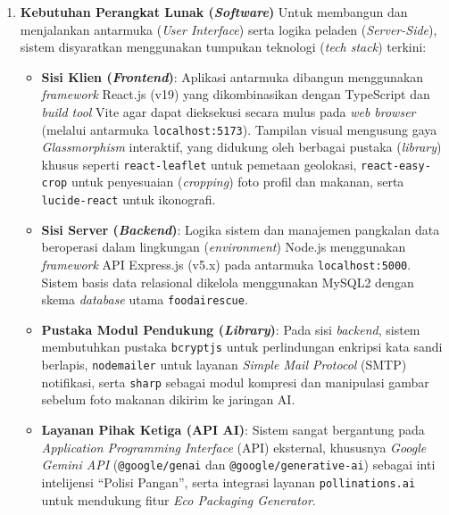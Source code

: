 \begin{enumerate}
    \item \textbf{Kebutuhan Perangkat Lunak (\textit{Software})}
    Untuk membangun dan menjalankan antarmuka (\textit{User Interface}) serta logika peladen (\textit{Server-Side}), sistem disyaratkan menggunakan tumpukan teknologi (\textit{tech stack}) terkini:
    \begin{itemize}
        \item \textbf{Sisi Klien (\textit{Frontend})}: Aplikasi antarmuka dibangun menggunakan \textit{framework} React.js (v19) yang dikombinasikan dengan TypeScript dan \textit{build tool} Vite agar dapat dieksekusi secara mulus pada \textit{web browser} (melalui antarmuka \texttt{localhost:5173}). Tampilan visual mengusung gaya \textit{Glassmorphism} interaktif, yang didukung oleh berbagai pustaka (\textit{library}) khusus seperti \texttt{react-leaflet} untuk pemetaan geolokasi, \texttt{react-easy-crop} untuk penyesuaian (\textit{cropping}) foto profil dan makanan, serta \texttt{lucide-react} untuk ikonografi.
        \item \textbf{Sisi Server (\textit{Backend})}: Logika sistem dan manajemen pangkalan data beroperasi dalam lingkungan (\textit{environment}) Node.js menggunakan \textit{framework} API Express.js (v5.x) pada antarmuka \texttt{localhost:5000}. Sistem basis data relasional dikelola menggunakan MySQL2 dengan skema \textit{database} utama \texttt{foodairescue}.
        \item \textbf{Pustaka Modul Pendukung (\textit{Library})}: Pada sisi \textit{backend}, sistem membutuhkan pustaka \texttt{bcryptjs} untuk perlindungan enkripsi kata sandi berlapis, \texttt{nodemailer} untuk layanan \textit{Simple Mail Protocol} (SMTP) notifikasi, serta \texttt{sharp} sebagai modul kompresi dan manipulasi gambar sebelum foto makanan dikirim ke jaringan AI.
        \item \textbf{Layanan Pihak Ketiga (API AI)}: Sistem sangat bergantung pada \textit{Application Programming Interface} (API) eksternal, khususnya \textit{Google Gemini API} (\texttt{@google/genai} dan \texttt{@google/generative-ai}) sebagai inti intelijensi ``Polisi Pangan'', serta integrasi layanan \texttt{pollinations.ai} untuk mendukung fitur \textit{Eco Packaging Generator}.
    \end{itemize}


\end{enumerate}

